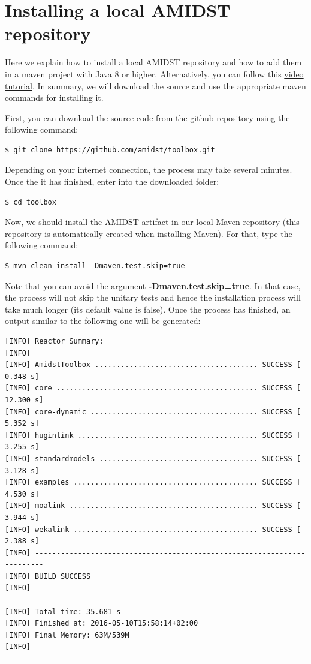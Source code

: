 \documentclass[10pt,a4paper]{article}
\begin{document}
\section{Installing a local AMIDST repository}

Here we explain how to install a local AMIDST repository and how to add
them in a maven project with Java 8 or higher. Alternatively, you can
follow this \href{https://www.youtube.com/watch?v=WvPzJIvGACE}{video
	tutorial}. In summary, we will download the source and use the
appropriate maven commands for installing it.\newline 

First,
you can download the source code from the github repository using the following
command:

\begin{verbatim}
$ git clone https://github.com/amidst/toolbox.git      
\end{verbatim}

Depending on your internet connection, the process may take several minutes. Once the it has finished, enter into the downloaded
folder:\newline 

\begin{verbatim}
$ cd toolbox     
\end{verbatim}

Now, we should install the AMIDST artifact in our local Maven repository (this repository is automatically created when installing Maven). For that, type the following
command:

\begin{verbatim}
$ mvn clean install -Dmaven.test.skip=true   
\end{verbatim}

Note that you can avoid the argument \textbf{-Dmaven.test.skip=true}. In that
case, the process will not skip the unitary tests and hence the
installation process will take much longer (its default value is false).
Once the process has finished, an output similar to the following one
will be generated:\\


\begin{verbatim}
[INFO] Reactor Summary:
[INFO] 
[INFO] AmidstToolbox ...................................... SUCCESS [  0.348 s]
[INFO] core ............................................... SUCCESS [ 12.300 s]
[INFO] core-dynamic ....................................... SUCCESS [  5.352 s]
[INFO] huginlink .......................................... SUCCESS [  3.255 s]
[INFO] standardmodels ..................................... SUCCESS [  3.128 s]
[INFO] examples ........................................... SUCCESS [  4.530 s]
[INFO] moalink ............................................ SUCCESS [  3.944 s]
[INFO] wekalink ........................................... SUCCESS [  2.388 s]
[INFO] ------------------------------------------------------------------------
[INFO] BUILD SUCCESS
[INFO] ------------------------------------------------------------------------
[INFO] Total time: 35.681 s
[INFO] Finished at: 2016-05-10T15:58:14+02:00
[INFO] Final Memory: 63M/539M
[INFO] ------------------------------------------------------------------------
\end{verbatim}
\end{document}
